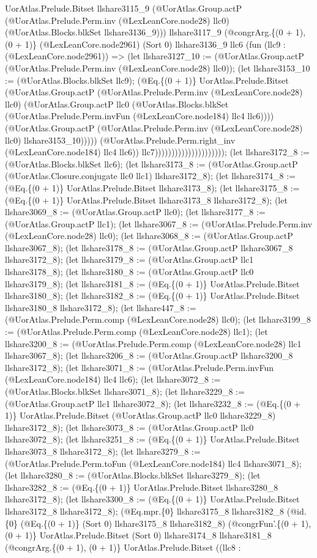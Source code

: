 \documentclass[11pt]{article}
\begin{document}
UorAtlas.Prelude.Bitset llshare3115\_9 (@UorAtlas.Group.actP (@UorAtlas.Prelude.Perm.inv (@LexLeanCore.node28) llc0) (@UorAtlas.Blocks.blkSet llshare3136\_9))) llshare3117\_9 (@congrArg.\{(0 + 1), (0 + 1)\} (@LexLeanCore.node2961) (Sort 0) llshare3136\_9 llc6 (fun (llc9 : (@LexLeanCore.node2961)) => (let llshare3127\_10 := (@UorAtlas.Group.actP (@UorAtlas.Prelude.Perm.inv (@LexLeanCore.node28) llc0)); (let llshare3153\_10 := (@UorAtlas.Blocks.blkSet llc9); (@Eq.\{(0 + 1)\} UorAtlas.Prelude.Bitset (@UorAtlas.Group.actP (@UorAtlas.Prelude.Perm.inv (@LexLeanCore.node28) llc0) (@UorAtlas.Group.actP llc0 (@UorAtlas.Blocks.blkSet (@UorAtlas.Prelude.Perm.invFun (@LexLeanCore.node184) llc4 llc6)))) (@UorAtlas.Group.actP (@UorAtlas.Prelude.Perm.inv (@LexLeanCore.node28) llc0) llshare3153\_10))))) (@UorAtlas.Prelude.Perm.right\_inv (@LexLeanCore.node184) llc4 llc6)) llc7))))))))))))))))))))); (let llshare3172\_8 := (@UorAtlas.Blocks.blkSet llc6); (let llshare3173\_8 := (@UorAtlas.Group.actP (@UorAtlas.Closure.conjugate llc0 llc1) llshare3172\_8); (let llshare3174\_8 := (@Eq.\{(0 + 1)\} UorAtlas.Prelude.Bitset llshare3173\_8); (let llshare3175\_8 := (@Eq.\{(0 + 1)\} UorAtlas.Prelude.Bitset llshare3173\_8 llshare3172\_8); (let llshare3069\_8 := (@UorAtlas.Group.actP llc0); (let llshare3177\_8 := (@UorAtlas.Group.actP llc1); (let llshare3067\_8 := (@UorAtlas.Prelude.Perm.inv (@LexLeanCore.node28) llc0); (let llshare3068\_8 := (@UorAtlas.Group.actP llshare3067\_8); (let llshare3178\_8 := (@UorAtlas.Group.actP llshare3067\_8 llshare3172\_8); (let llshare3179\_8 := (@UorAtlas.Group.actP llc1 llshare3178\_8); (let llshare3180\_8 := (@UorAtlas.Group.actP llc0 llshare3179\_8); (let llshare3181\_8 := (@Eq.\{(0 + 1)\} UorAtlas.Prelude.Bitset llshare3180\_8); (let llshare3182\_8 := (@Eq.\{(0 + 1)\} UorAtlas.Prelude.Bitset llshare3180\_8 llshare3172\_8); (let llshare447\_8 := (@UorAtlas.Prelude.Perm.comp (@LexLeanCore.node28) llc0); (let llshare3199\_8 := (@UorAtlas.Prelude.Perm.comp (@LexLeanCore.node28) llc1); (let llshare3200\_8 := (@UorAtlas.Prelude.Perm.comp (@LexLeanCore.node28) llc1 llshare3067\_8); (let llshare3206\_8 := (@UorAtlas.Group.actP llshare3200\_8 llshare3172\_8); (let llshare3071\_8 := (@UorAtlas.Prelude.Perm.invFun (@LexLeanCore.node184) llc4 llc6); (let llshare3072\_8 := (@UorAtlas.Blocks.blkSet llshare3071\_8); (let llshare3229\_8 := (@UorAtlas.Group.actP llc1 llshare3072\_8); (let llshare3232\_8 := (@Eq.\{(0 + 1)\} UorAtlas.Prelude.Bitset (@UorAtlas.Group.actP llc0 llshare3229\_8) llshare3172\_8); (let llshare3073\_8 := (@UorAtlas.Group.actP llc0 llshare3072\_8); (let llshare3251\_8 := (@Eq.\{(0 + 1)\} UorAtlas.Prelude.Bitset llshare3073\_8 llshare3172\_8); (let llshare3279\_8 := (@UorAtlas.Prelude.Perm.toFun (@LexLeanCore.node184) llc4 llshare3071\_8); (let llshare3280\_8 := (@UorAtlas.Blocks.blkSet llshare3279\_8); (let llshare3282\_8 := (@Eq.\{(0 + 1)\} UorAtlas.Prelude.Bitset llshare3280\_8 llshare3172\_8); (let llshare3300\_8 := (@Eq.\{(0 + 1)\} UorAtlas.Prelude.Bitset llshare3172\_8 llshare3172\_8); (@Eq.mpr.\{0\} llshare3175\_8 llshare3182\_8 (@id.\{0\} (@Eq.\{(0 + 1)\} (Sort 0) llshare3175\_8 llshare3182\_8) (@congrFun'.\{(0 + 1), (0 + 1)\} UorAtlas.Prelude.Bitset (Sort 0) llshare3174\_8 llshare3181\_8 (@congrArg.\{(0 + 1), (0 + 1)\} UorAtlas.Prelude.Bitset ((llc8 : 
\end{document}
